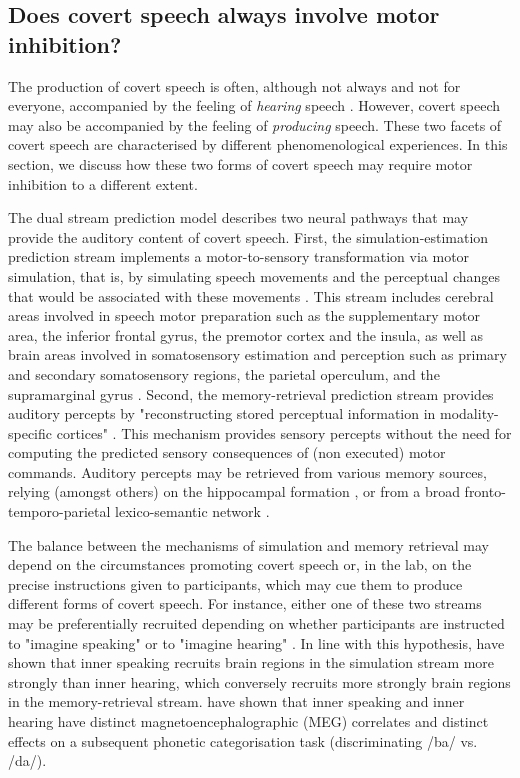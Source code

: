 \documentclass[utf8]{template/frontiersSCNS} %
\begin{document}
\subsection{Does covert speech always involve motor inhibition?}

The production of covert speech is often, although not always and not for everyone, accompanied by the feeling of \textit{hearing} speech \citep{hurlburt_investigating_2011}. However, covert speech may also be accompanied by the feeling of \textit{producing} speech. These two facets of covert speech are characterised by different phenomenological experiences. In this section, we discuss how these two forms of covert speech may require motor inhibition to a different extent.

The dual stream prediction model \citep{tian_mental_2012, tian_effect_2013, tian_mental_2016} describes two neural pathways that may provide the auditory content of covert speech. First, the simulation-estimation prediction stream implements a motor-to-sensory transformation via motor simulation, that is, by simulating speech movements and the perceptual changes that would be associated with these movements \citep[see also][for a similar proposal]{loevenbruck_cognitive_2018}. This stream includes cerebral areas involved in speech motor preparation such as the supplementary motor area, the inferior frontal gyrus, the premotor cortex and the insula, as well as brain areas involved in somatosensory estimation and perception such as primary and secondary somatosensory regions, the parietal operculum, and the supramarginal gyrus \citep{tian_mental_2016}. Second, the memory-retrieval prediction stream provides auditory percepts by "reconstructing stored perceptual information in modality-specific cortices" \citep{tian_mental_2016}. This mechanism provides sensory percepts without the need for computing the predicted sensory consequences of (non executed) motor commands. Auditory percepts may be retrieved from various memory sources, relying (amongst others) on the hippocampal formation \citep{tian_mental_2016}, or from a broad fronto-temporo-parietal lexico-semantic network \citep[for more details, see][]{tian_mental_2016}.

The balance between the mechanisms of simulation and memory retrieval may depend on the circumstances promoting covert speech or, in the lab, on the precise instructions given to participants, which may cue them to produce different forms of covert speech. For instance, either one of these two streams may be preferentially recruited depending on whether participants are instructed to "imagine speaking" or to "imagine hearing" \citep[see also the distinction between the "inner ear" and the "inner voice", e.g.,][]{smith_subvocalization_1992}. In line with this hypothesis, \cite{tian_mental_2016} have shown that inner speaking recruits brain regions in the simulation stream more strongly than inner hearing, which conversely recruits more strongly brain regions in the memory-retrieval stream. \cite{ma_distinct_2019} have shown that inner speaking and inner hearing have distinct magnetoencephalographic (MEG) correlates and distinct effects on a subsequent phonetic categorisation task (discriminating /ba/ vs. /da/).
\end{document}
